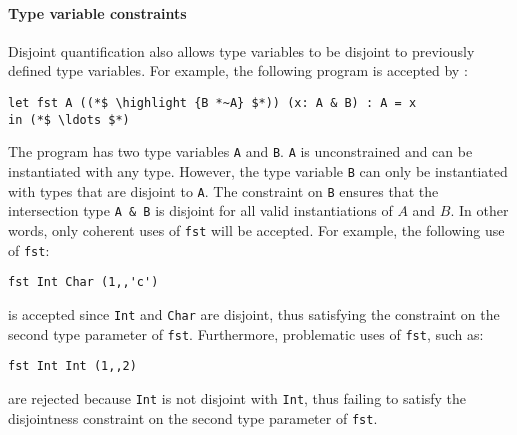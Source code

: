 \paragraph{Type variable constraints}
Disjoint quantification also allows type variables to be disjoint 
to previously defined type variables. For example, the following
program is accepted by \name:
\begin{lstlisting}
let fst A ((*$ \highlight {B *~A} $*)) (x: A & B) : A = x
in (*$ \ldots $*)
\end{lstlisting}
The program has two type variables \lstinline{A} and \lstinline{B}. 
\lstinline{A} is unconstrained and can be instantiated with any type. 
However, the type variable \lstinline{B} can only be instantiated
with types that are disjoint to \lstinline{A}. 
The constraint on \lstinline{B} ensures that the
intersection type \lstinline{A & B} is disjoint for all valid instantiations of $A$ and $B$.
In other words, only coherent uses of \lstinline$fst$ will be accepted.
For example, the following use of \lstinline$fst$:
\begin{lstlisting}
fst Int Char (1,,'c')
\end{lstlisting}
is accepted since \lstinline$Int$ and \lstinline$Char$ are disjoint, thus satisfying the constraint
on the second type parameter of \lstinline$fst$.
Furthermore, problematic uses of \lstinline$fst$, such as:
\begin{lstlisting}
fst Int Int (1,,2)
\end{lstlisting}
\noindent are rejected because \lstinline$Int$ is not disjoint with \lstinline$Int$, thus failing to satisfy the
disjointness constraint on the second type parameter of \lstinline$fst$.

